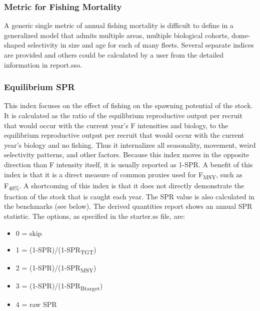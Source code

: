\subsubsection{Metric for Fishing Mortality}
A generic single metric of annual fishing mortality is difficult to define in a generalized model that admits multiple areas, multiple biological cohorts, dome-shaped selectivity in size and age for each of many fleets.  Several separate indices are provided and others could be calculated by a user from the detailed information in report.sso.

\subsubsection{Equilibrium SPR}
This index focuses on the effect of fishing on the spawning potential of the stock.  It is calculated as the ratio of the equilibrium reproductive output per recruit that would occur with the current year’s F intensities and biology, to the equilibrium reproductive output per recruit that would occur with the current year’s biology and no fishing.  Thus it internalizes all seasonality, movement, weird selectivity patterns, and other factors.  Because this index moves in the opposite direction than F intensity itself, it is usually reported as 1-SPR.  A benefit of this index is that it is a direct measure of common proxies used for F\textsubscript{MSY}, such as F\textsubscript {40\%}.  A shortcoming of this index is that it does not directly demonstrate the fraction of the stock that is caught each year.  The SPR value is also calculated in the benchmarks (see below).  The derived quantities report shows an annual SPR statistic.  The options, as specified in the starter.ss file, are:
\begin{itemize}
	\item 0 = skip
	\item 1 = (1-SPR)/(1-SPR\textsubscript{TGT})
	\item 2 = (1-SPR)/(1-SPR\textsubscript{MSY})
	\item 3 = (1-SPR)/(1-SPR\textsubscript{Btarget})
	\item 4 = raw SPR
\end{itemize}

